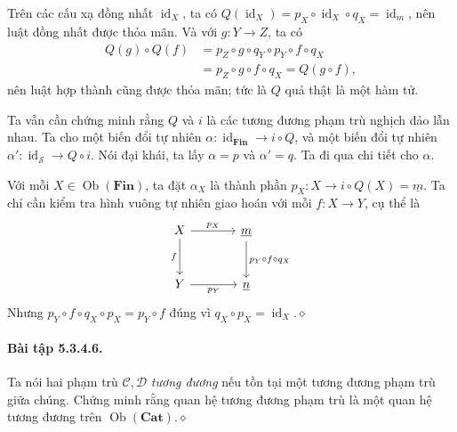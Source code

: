 Trên các cấu xạ đồng nhất $\operatorname{id}_X$, ta có $Q(\operatorname{id}_X)=p_X\circ\operatorname{id}_X\circ q_X=\operatorname{id}_{\underline{m}}$, nên luật đồng nhất được thỏa mãn. Và với $g:Y\to Z$, ta có
\[\begin{aligned}Q(g)\circ Q(f)&=p_Z\circ g\circ q_Y\circ p_Y\circ f\circ q_X\\&=p_Z\circ g\circ f\circ q_X=Q(g\circ f),\end{aligned}\]
nên luật hợp thành cũng được thỏa mãn; tức là $Q$ quả thật là một hàm tử.

Ta vẫn cần chứng minh rằng $Q$ và $i$ là các tương đương phạm trù nghịch đảo lẫn nhau. Ta cho một biến đổi tự nhiên $\alpha:\operatorname{id}_{\mathbf{Fin}}\to i\circ Q$, và một biến đổi tự nhiên $\alpha':\operatorname{id}_{\mathcal S}\to Q\circ i$. Nói đại khái, ta lấy $\alpha=p$ và $\alpha'=q$. Ta đi qua chi tiết cho $\alpha$.

Với mỗi $X\in\operatorname{Ob}(\mathbf{Fin})$, ta đặt $\alpha_X$ là thành phần $p_X:X\to i\circ Q(X)=\underline{m}$. Ta chỉ cần kiểm tra hình vuông tự nhiên giao hoán với mỗi $f:X\to Y$, cụ thể là
\[\begin{tikzcd}[column sep=large,row sep=large]X\arrow[r,"p_X"]\arrow[d,"f"']&\underline{m}\arrow[d,"p_Y\circ f\circ q_X"]\\Y\arrow[r,"p_Y"']&\underline{n}\end{tikzcd}\]
Nhưng $p_Y\circ f\circ q_X\circ p_X=p_Y\circ f$ đúng vì $q_X\circ p_X=\operatorname{id}_X$.\hfill$\diamond$
\paragraph{Bài tập 5.3.4.6.} Ta nói hai phạm trù $\mathcal C,\mathcal D$ \emph{tương đương} nếu tồn tại một tương đương phạm trù giữa chúng. Chứng minh rằng quan hệ tương đương phạm trù là một quan hệ tương đương trên $\operatorname{Ob}(\mathbf{Cat})$.\hfill$\diamond$
